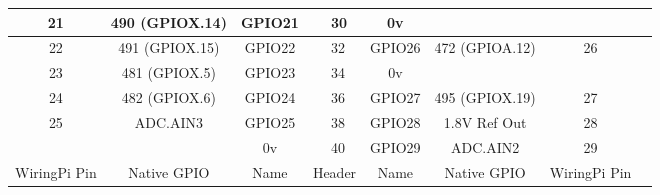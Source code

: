 \documentclass[11pt,a4paper]{article}
\begin{document}
\begin{sffamily}
\begin{center}
\begin{tabular}{|c|c|c||p{8mm}|p{8mm}||c|c|c|c|}
\hline
21	& 490 (GPIOX.14)	& \textcolor{rtb-green}{GPIO21}	& \raggedleft{29} & 30 & \textcolor{rtb-black}{0v}		&					& \\
\hline
22	& 491 (GPIOX.15)	& \textcolor{rtb-green}{GPIO22}	& \raggedleft{31} & 32 & \textcolor{rtb-green}{GPIO26}	& 472 (GPIOA.12)	& 26\\
\hline
23	& 481 (GPIOX.5)		& \textcolor{rtb-green}{GPIO23}	& \raggedleft{33} & 34 & \textcolor{rtb-black}{0v}		&					& \\
\hline
24	& 482 (GPIOX.6)		& \textcolor{rtb-green}{GPIO24}	& \raggedleft{35} & 36 & \textcolor{rtb-green}{GPIO27}	& 495 (GPIOX.19)	& 27\\
\hline
25	& ADC.AIN3			& \textcolor{rtb-green}{GPIO25}	& \raggedleft{37} & 38 & \textcolor{rtb-green}{GPIO28}	& 1.8V Ref Out		& 28\\
\hline
	& 					& \textcolor{rtb-black}{0v}		& \raggedleft{39} & 40 & \textcolor{rtb-green}{GPIO29}	& ADC.AIN2			& 29\\
\hline
\hline
WiringPi Pin	& Native GPIO	& Name	& \multicolumn{2}{|c||}{Header}	& Name	& Native GPIO	& WiringPi Pin\\
\hline
\end{tabular}
\end{center}

\end{sffamily}
\end{document}
